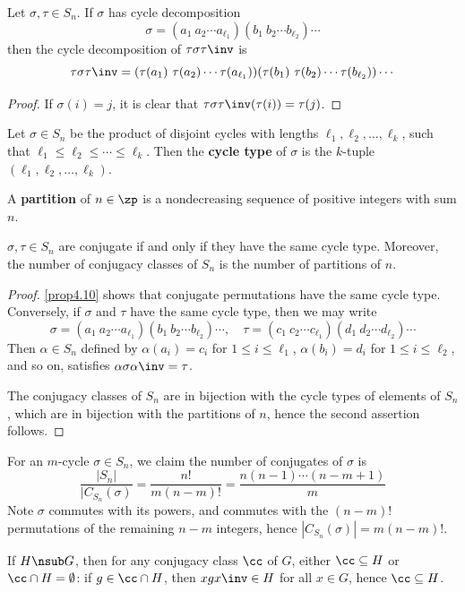 \prop[Conjugation in $S_n$] \label{prop4.10}
Let $\sigma, \tau \in S_n$. If $\sigma$ has cycle decomposition
\[\sigma = (a_1\ a_2 \cdots a_{\ell_1})(b_1\ b_2 \cdots b_{\ell_2}) \cdots\]
then the cycle decomposition of $\tau\sigma\tau\inv$ is
\[\tau\sigma\tau\inv = (\tau(a_1)\ \tau(a_2) \cdots \tau(a_{\ell_1}))(\tau(b_1)\ \tau(b_2) \cdots \tau(b_{\ell_2})) \cdots\]
\begin{proof}
    If $\sigma(i) = j$, it is clear that $\tau\sigma\tau\inv(\tau(i)) = \tau(j)$.
\end{proof}

 Let $\sigma \in S_n$ be the product of disjoint cycles with lengths $\ell_1, \ell_2, \ldots, \ell_k$, such that $\ell_1 \leq \ell_2 \leq \cdots \leq \ell_k$. Then the \textbf{cycle type} of $\sigma$ is the $k$-tuple $(\ell_1, \ell_2, \ldots, \ell_k)$.

 A \textbf{partition} of $n \in \zp$ is a nondecreasing sequence of positive integers with sum $n$.

 \label{prop4.11}
$\sigma, \tau \in S_n$ are conjugate if and only if they have the same cycle type. Moreover, the number of conjugacy classes of $S_n$ is the number of partitions of $n$.
\begin{proof}
    \autoref{prop4.10} shows that conjugate permutations have the same cycle type. Conversely, if $\sigma$ and $\tau$ have the same cycle type, then we may write
    \[\sigma = (a_1\ a_2 \cdots a_{\ell_1})(b_1\ b_2 \cdots b_{\ell_2}) \cdots, \quad \tau = (c_1\ c_2 \cdots c_{\ell_1})(d_1\ d_2 \cdots d_{\ell_2}) \cdots\]
    Then $\alpha \in S_n$ defined by $\alpha(a_i) = c_i$ for $1 \leq i \leq \ell_1$, $\alpha(b_i) = d_i$ for $1 \leq i \leq \ell_2$, and so on, satisfies $\alpha\sigma\alpha\inv = \tau$.

    The conjugacy classes of $S_n$ are in bijection with the cycle types of elements of $S_n$, which are in bijection with the partitions of $n$, hence the second assertion follows.
\end{proof}

\ex For an $m$-cycle $\sigma \in S_n$, we claim the number of conjugates of $\sigma$ is
\[\frac{|S_n|}{|C_{S_n}(\sigma)} = \frac{n!}{m(n - m)!} = \frac{n(n - 1) \cdots (n - m + 1)}{m}\]
Note $\sigma$ commutes with its powers, and commutes with the $(n - m)!$ permutations of the remaining $n - m$ integers, hence $|C_{S_n}(\sigma)| = m(n - m)!$.

\note If $H \nsub G$, then for any conjugacy class $\cc$ of $G$, either $\cc \subseteq H$ or $\cc \cap H = \emptyset$: if $g \in \cc \cap H$, then $xgx\inv \in H$ for all $x \in G$, hence $\cc \subseteq H$.

